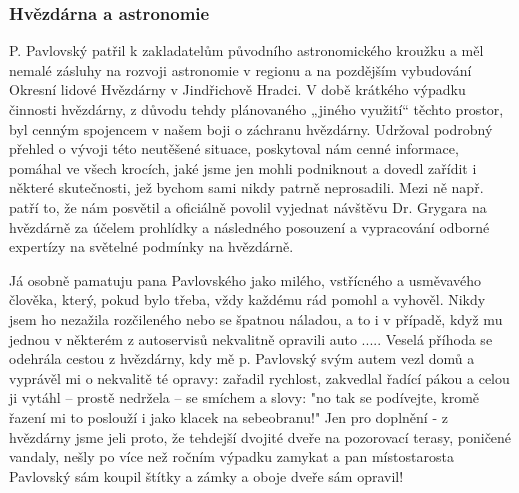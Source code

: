 \documentclass[10pt,a5paper,twoside]{book}
\begin{document}
\subsubsection*{Hvězdárna a astronomie}
P. Pavlovský patřil k zakladatelům původního astronomického kroužku a měl nemalé zásluhy na rozvoji astronomie v regionu a na pozdějším vybudování Okresní lidové Hvězdárny v Jindřichově Hradci. V době krátkého výpadku činnosti hvězdárny, z důvodu tehdy plánovaného „jiného využití“ těchto prostor, byl cenným spojencem v našem boji o záchranu hvězdárny. Udržoval podrobný přehled o vývoji této neutěšené situace, poskytoval nám cenné informace, pomáhal ve všech krocích, jaké jsme jen mohli podniknout a dovedl zařídit i některé skutečnosti, jež bychom sami nikdy patrně neprosadili. Mezi ně např. patří to, že nám posvětil a oficiálně povolil vyjednat návštěvu Dr. Grygara na hvězdárně za účelem prohlídky a následného posouzení a vypracování odborné expertízy na světelné podmínky na hvězdárně.


Já osobně pamatuju pana Pavlovského jako milého, vstřícného a usměvavého člověka, který, pokud bylo třeba, vždy každému rád pomohl a vyhověl. Nikdy jsem ho nezažila rozčileného nebo se špatnou náladou, a to i v případě, když mu jednou v některém z autoservisů nekvalitně opravili auto ..... Veselá příhoda se odehrála cestou z hvězdárny, kdy mě p. Pavlovský svým autem vezl domů a vyprávěl mi o nekvalitě té opravy: zařadil rychlost, zakvedlal řadící pákou a celou ji vytáhl – prostě nedržela – se smíchem a slovy: "no tak se podívejte, kromě řazení mi to poslouží i jako klacek na sebeobranu!" Jen pro doplnění - z hvězdárny jsme jeli proto, že tehdejší dvojité dveře na pozorovací terasy, poničené vandaly, nešly po více než ročním výpadku zamykat a pan místostarosta Pavlovský sám koupil štítky a zámky a oboje dveře sám opravil!
\end{document}
